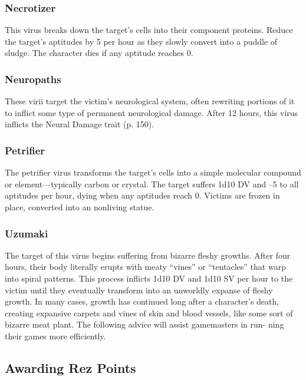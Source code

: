 \subsubsection{Necrotizer}

This virus breaks down the target's cells into their 
component proteins. Reduce the target's aptitudes by 
5 per hour as they slowly convert into a puddle of 
sludge. The character dies if any aptitude reaches 0.

\subsubsection{Neuropaths}

These virii target the victim's neurological system, 
often rewriting portions of it to inflict some type of 
permanent neurological damage. After 12 hours, this 
virus inflicts the Neural Damage trait (p. 150).

\subsubsection{Petrifier}

The petrifier virus transforms the target's cells into 
a simple molecular compound or element—typically 
carbon or crystal. The target suffers 1d10 DV and –5 
to all aptitudes per hour, dying when any aptitudes 
reach 0. Victims are frozen in place, converted into an 
nonliving statue.

\subsubsection{Uzumaki}

The target of this virus begins suffering from bizarre 
fleshy growths. After four hours, their body literally 
erupts with meaty ``vines'' or ``tentacles'' that warp 
into spiral patterns. This process inflicts 1d10 DV and 
1d10 SV per hour to the victim until they eventually 
transform into an unworldly expanse of fleshy growth. 
In many cases, growth has continued long after a 
character's death, creating expansive carpets and vines 
of skin and blood vessels, like some sort of bizarre 
meat plant.
The following advice will assist gamemasters in run-
ning their games more efficiently.

\subsection{Awarding Rez Points }

